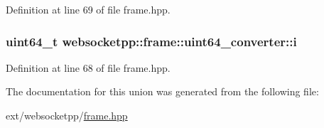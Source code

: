 Definition at line 69 of file frame.\+hpp.

\hypertarget{unionwebsocketpp_1_1frame_1_1uint64__converter_a5440031a82ed910e25f6d75c59ab0a88}{}
\subsubsection[{i}]{\setlength{\rightskip}{0pt plus 5cm}uint64\+\_\+t websocketpp\+::frame\+::uint64\+\_\+converter\+::i}\label{unionwebsocketpp_1_1frame_1_1uint64__converter_a5440031a82ed910e25f6d75c59ab0a88}


Definition at line 68 of file frame.\+hpp.



The documentation for this union was generated from the following file\+:\begin{DoxyCompactItemize}
\item 
ext/websocketpp/\hyperlink{frame_8hpp}{frame.\+hpp}\end{DoxyCompactItemize}
